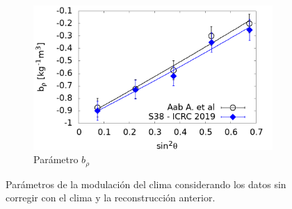 \begin{figure}[H]
\begin{subfigure}[b]{\textwidth}
                \centering
                \includegraphics[width=0.5\linewidth]{Graphs/params/brho_ICRC_2019_S38_above_0EeV.png}
                \caption{Parámetro  $b_{\rho}$	 }
                \label{fig:brho_2019_S38}
                \end{subfigure}%
                \caption{Parámetros de la modulación del clima considerando los datos sin corregir con el clima y la reconstrucción anterior.}\label{fig:parameters_new_S38}
            \end{figure}
